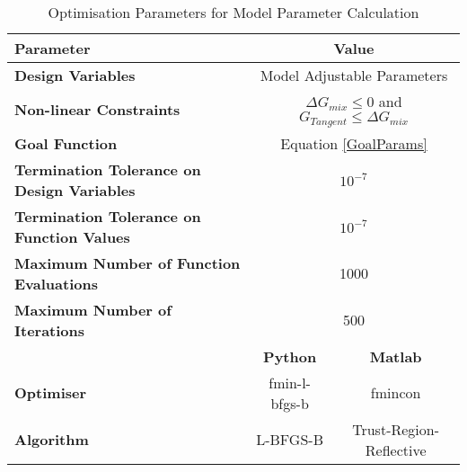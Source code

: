 			\begin{table}
			\begin{tabular*}{\textwidth}{l|cc}
				\hline
				\textbf{Parameter}&\multicolumn{2}{c}{\textbf{Value}}\\
				\hline
				\hline
				\textbf{Design Variables}& \multicolumn{2}{c}{Model Adjustable Parameters}\\
				\textbf{Non-linear Constraints}& \multicolumn{2}{c}{$\Delta G_{mix} \leq 0$ and $G_{Tangent} \leq \Delta G_{mix}$ }\\
				\textbf{Goal Function}& \multicolumn{2}{c}{Equation \ref{GoalParams}}  \\
				\textbf{Termination Tolerance on Design Variables}& \multicolumn{2}{c}{$10^{-7}$ }\\
				\textbf{Termination Tolerance on Function Values}& \multicolumn{2}{c}{$10^{-7}$}\\
				\textbf{Maximum Number of Function Evaluations}& \multicolumn{2}{c}{1000}\\
				\textbf{Maximum Number of Iterations}& \multicolumn{2}{c}{500}\\				
				\cline{2-3}
				&\textbf{Python}&\textbf{Matlab}\\
				\cline{2-3}
				\textbf{Optimiser }&fmin-l-bfgs-b&fmincon\\
				\textbf{Algorithm}& L-BFGS-B &Trust-Region-Reflective\\
				\hline
				\end{tabular*}\\
			\caption{Optimisation Parameters for Model Parameter Calculation} \label{PhaseEqOptParam}			
		\end{table}	\
					
				
			
				

		
